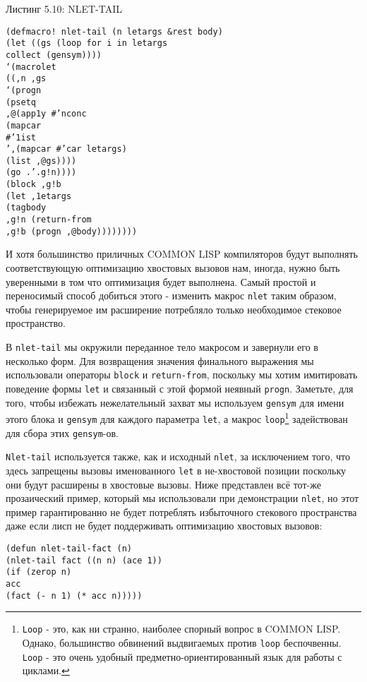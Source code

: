 Листинг 5.10: NLET-TAIL\label{listing_5.10}
\listbegin
\begin{verbatim}
(defmacro! nlet-tail (n letargs &rest body)
(let ((gs (loop for i in letargs
collect (gensym))))
‘(macrolet
((,n ,gs
‘(progn
(psetq
,@(app1y #’nconc
(mapcar
#’1ist
’,(mapcar #’car letargs)
(list ,@gs))))
(go .’.g!n))))
(block ,g!b
(let ,1etargs
(tagbody
,g!n (return-from
,g!b (progn ,@body))))))))
\end{verbatim}
\listend

И хотя большинство приличных COMMON LISP компиляторов будут выполнять соответствующую оптимизацию хвостовых вызовов нам, иногда, нужно быть уверенными в том что оптимизация будет выполнена. Самый простой и переносимый способ добиться этого - изменить макрос \verb"nlet" таким образом, чтобы генерируемое им расширение потребляло только необходимое стековое пространство.

В \verb"nlet-tail" мы окружили переданное тело макросом и завернули его в несколько форм. Для возвращения значения финального выражения мы использовали операторы \verb"block" и \verb"return-from", поскольку мы хотим имитировать поведение формы \verb"let" и связанный с этой формой неявный \verb"progn". Заметьте, для того, чтобы избежать нежелательный захват мы используем \verb"gensym" для имени этого блока и \verb"gensym" для каждого параметра \verb"let", а макрос \verb"loop"\footnote{\verb"Loop" - это, как ни странно, наиболее спорный вопрос в COMMON LISP. Однако, большинство обвинений выдвигаемых против \verb"loop" беспочвенны. \verb"Loop" - это очень удобный предметно-ориентированный язык для работы с циклами.} задействован для сбора этих \verb"gensym"-ов.



\verb"Nlet-tail" используется также, как и исходный \verb"nlet", за исключением того, что здесь запрещены вызовы именованного \verb"let" в не-хвостовой позиции поскольку они будут расширены в хвостовые вызовы. Ниже представлен всё тот-же прозаический пример, который мы использовали при демонстрации \verb"nlet", но этот пример гарантированно не будет потреблять избыточного стекового пространства даже если лисп не будет поддерживать оптимизацию хвостовых вызовов:

\begin{verbatim}
(defun nlet-tail-fact (n)
(nlet-tail fact ((n n) (ace 1))
(if (zerop n)
acc
(fact (- n 1) (* acc n)))))
\end{verbatim}

